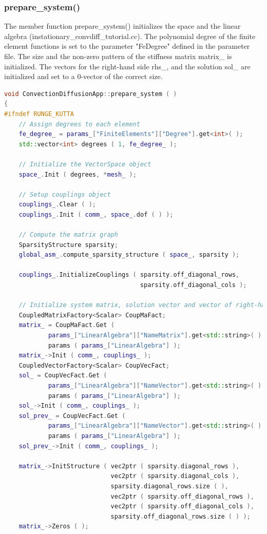 \documentclass[a4paper, 11pt, twoside]{article}
\begin{document}
\subsubsection{prepare\_system()}\label{sec:prepare}
The member function prepare\_system() initializes the space and the linear algebra (instationary\_convdiff\_tutorial.cc). The polynomial degree of the finite element functions is set to the parameter "FeDegree" defined in the parameter file. The size and the non-zero pattern of the stiffness matrix matrix\_ is initialized. The vectors for the right-hand side rhs\_, and the solution sol\_ are initialized and set to a 0-vector of the correct size.
\begin{lstlisting}[language=C++, basicstyle={\footnotesize, \ttfamily}, keywordstyle=\color{blue}, numbers=none, tabsize=4]
void ConvectionDiffusionApp::prepare_system ( )
{
#ifndef RUNGE_KUTTA
    // Assign degrees to each element
    fe_degree_ = params_["FiniteElements"]["Degree"].get<int>( );
    std::vector<int> degrees ( 1, fe_degree_ );

    // Initialize the VectorSpace object
    space_.Init ( degrees, *mesh_ );

    // Setup couplings object
    couplings_.Clear ( );
    couplings_.Init ( comm_, space_.dof ( ) );

    // Compute the matrix graph
    SparsityStructure sparsity;
    global_asm_.compute_sparsity_structure ( space_, sparsity );

    couplings_.InitializeCouplings ( sparsity.off_diagonal_rows,
                                     sparsity.off_diagonal_cols );

    // Initialize system matrix, solution vector and vector of right-hand side
    CoupledMatrixFactory<Scalar> CoupMaFact;
    matrix_ = CoupMaFact.Get (
            params_["LinearAlgebra"]["NameMatrix"].get<std::string>( ) )->
            params ( params_["LinearAlgebra"] );
    matrix_->Init ( comm_, couplings_ );
    CoupledVectorFactory<Scalar> CoupVecFact;
    sol_ = CoupVecFact.Get (
            params_["LinearAlgebra"]["NameVector"].get<std::string>( ) )->
            params ( params_["LinearAlgebra"] );
    sol_->Init ( comm_, couplings_ );
    sol_prev_ = CoupVecFact.Get (
            params_["LinearAlgebra"]["NameVector"].get<std::string>( ) )->
            params ( params_["LinearAlgebra"] );
    sol_prev_->Init ( comm_, couplings_ );

    matrix_->InitStructure ( vec2ptr ( sparsity.diagonal_rows ),
                             vec2ptr ( sparsity.diagonal_cols ),
                             sparsity.diagonal_rows.size ( ),
                             vec2ptr ( sparsity.off_diagonal_rows ),
                             vec2ptr ( sparsity.off_diagonal_cols ),
                             sparsity.off_diagonal_rows.size ( ) );
    matrix_->Zeros ( );


\end{lstlisting}
\end{document}
